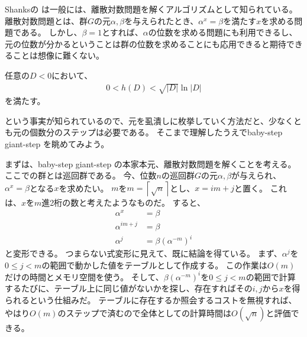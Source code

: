 Shanksの  は一般には、離散対数問題を解くアルゴリズムとして知られている。
離散対数問題とは、群$G$の元$\alpha,\beta$を与えられたとき、$\alpha^x=\beta$を満たす$x$を求める問題である。
しかし、$\beta=1$とすれば、$\alpha$の位数を求める問題にも利用できるし、元の位数が分かるということは群の位数を求めることにも応用できると期待できることは想像に難くない。

\begin{Prop}{}{}
任意の$D<0$において、
\begin{align*}
0 < h(D) < \sqrt{|D|}\ln{|D|}
\end{align*}
を満たす。
\end{Prop}

という事実が知られているので、元を虱潰しに枚挙していく方法だと、少なくとも元の個数分のステップは必要である。
そこまで理解したうえでbaby-step giant-step を眺めてみよう。

まずは、baby-step giant-step の本家本元、離散対数問題を解くことを考える。
ここでの群とは巡回群である。
今、位数$n$の巡回群$G$の元$\alpha,\beta$が与えられ、$\alpha^x=\beta$となる$x$を求めたい。
$m$を$m=\left\lceil \sqrt{n} \right\rceil$とし、$x=im+j$と置く。
これは、$x$を$m$進2桁の数と考えたようなものだ。
すると、
\begin{align*}
\alpha^x &= \beta\\
\alpha^{im+j} &= \beta\\
\alpha^j &= \beta(\alpha^{-m})^i
\end{align*}
と変形できる。
つまらない式変形に見えて、既に結論を得ている。
まず、$\alpha^j$を$0\le j<m$の範囲で動かした値をテーブルとして作成する。
この作業は$O(m)$だけの時間とメモリ空間を使う。
そして、$\beta(\alpha^{-m})^i$を$0\le j<m$の範囲で計算するたびに、テーブル上に同じ値がないかを探し、存在すればその$i,j$から$x$を得られるという仕組みだ。
テーブルに存在するか照会するコストを無視すれば、やはり$O(m)$のステップで済むので全体としての計算時間は$O(\sqrt{n})$と評価できる。

